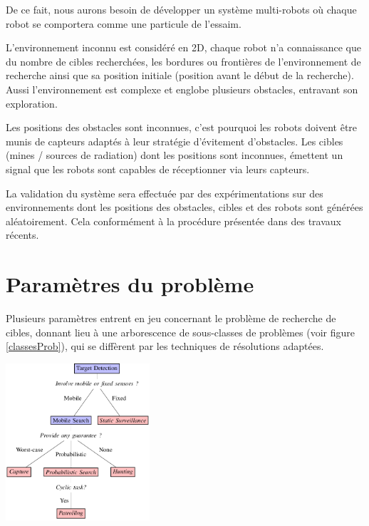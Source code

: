 De ce fait, nous aurons besoin de développer un système multi-robots où chaque robot se comportera comme une particule de l’essaim.

L’environnement inconnu est considéré en 2D, chaque robot n’a connaissance que du nombre de cibles recherchées, les bordures ou frontières de l’environnement de recherche ainsi que sa position initiale (position avant le début de la recherche).
Aussi l’environnement est complexe et englobe plusieurs obstacles, entravant son exploration.

Les positions des obstacles sont inconnues, c’est pourquoi les robots doivent être munis de capteurs adaptés à leur stratégie d’évitement d’obstacles.
Les cibles (mines / sources de radiation) dont les positions sont inconnues, émettent un signal que les robots sont capables de réceptionner via leurs capteurs.

La validation du système sera effectuée par des expérimentations sur des environnements dont les positions des obstacles, cibles et des robots sont générées aléatoirement. Cela conformément à la procédure présentée dans des travaux récents.





\section{Paramètres du problème}
Plusieurs paramètres entrent en jeu concernant le problème de recherche de cibles, donnant lieu à une arborescence de sous-classes de problèmes (voir figure \ref{classesProb}), qui se diffèrent par les techniques de résolutions adaptées.

\begin{center}	  
	\includegraphics[width=0.4\textwidth]{../Figures/targetdetection.png}%
	\vspace{-0.1 cm}
	\label{classesProb}%
\end{center}

